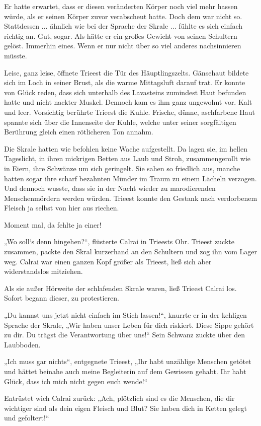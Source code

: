 Er hatte erwartet, dass er diesen veränderten Körper noch viel mehr hassen würde, als er seinen Körper zuvor verabscheut hatte. Doch dem war nicht so. Stattdessen ... ähnlich wie bei der Sprache der Skrale ... fühlte es sich einfach richtig an. Gut, sogar. Als hätte er ein großes Gewicht von seinen Schultern gelöst. Immerhin eines. Wenn er nur nicht über so viel anderes nachsinnieren müsste.

Leise, ganz leise, öffnete Trieest die Tür des Häuptlingszelts. Gänsehaut bildete sich im Loch in seiner Brust, als die warme Mittagsluft darauf trat. Er konnte von Glück reden, dass sich unterhalb des Lavasteins zumindest Haut befunden hatte und nicht nackter Muskel. Dennoch kam es ihm ganz ungewohnt vor. Kalt und leer. Vorsichtig berührte Trieest die Kuhle. Frische, dünne, aschfarbene Haut spannte sich über die Innenseite der Kuhle, welche unter seiner sorgfältigen Berührung gleich einen rötlicheren Ton annahm.

Die Skrale hatten wie befohlen keine Wache aufgestellt. Da lagen sie, im hellen Tageslicht, in ihren mickrigen Betten aus Laub und Stroh, zusammengerollt wie in Eiern, ihre Schwänze um sich geringelt. Sie sahen so friedlich aus, manche hatten sogar ihre scharf bezahnten Münder im Traum zu einem Lächeln verzogen. Und dennoch wusste, dass sie in der Nacht wieder zu marodierenden Menschenmördern werden würden. Trieest konnte den Gestank nach verdorbenem Fleisch ja selbst von hier aus riechen.

Moment mal, da fehlte ja einer!

„Wo soll‘s denn hingehen?“, flüsterte Calrai in Trieests Ohr. Trieest zuckte zusammen, packte den Skral kurzerhand an den Schultern und zog ihn vom Lager weg. Calrai war einen ganzen Kopf größer als Trieest, ließ sich aber widerstandslos mitziehen.

Als sie außer Hörweite der schlafenden Skrale waren, ließ Trieest Calrai los. Sofort begann dieser, zu protestieren.

„Du kannst uns jetzt nicht einfach im Stich lassen!“, knurrte er in der kehligen Sprache der Skrale, „Wir haben unser Leben für dich riskiert. Diese Sippe gehört zu dir. Du trägst die Verantwortung über uns!“ Sein Schwanz zuckte über den Laubboden.

„Ich muss gar nichts“, entgegnete Trieest, „Ihr habt unzählige Menschen getötet und hättet beinahe auch meine Begleiterin auf dem Gewissen gehabt. Ihr habt Glück, dass ich mich nicht gegen euch wende!“

Entrüstet wich Calrai zurück: „Ach, plötzlich sind es die Menschen, die dir wichtiger sind als dein eigen Fleisch und Blut? Sie haben dich in Ketten gelegt und gefoltert!“

